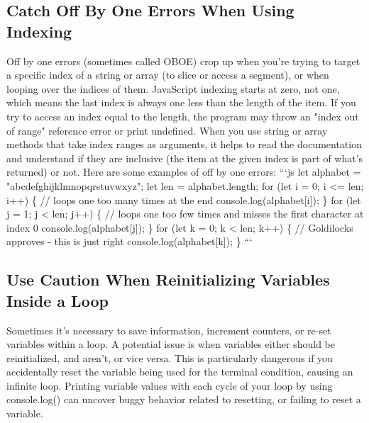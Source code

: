 \documentclass{article}%
\begin{document}
\subsection{Catch Off By One Errors When Using Indexing}%
\label{subsec:CatchOffByOneErrorsWhenUsingIndexing}%
Off by one errors (sometimes called OBOE) crop up when you're trying to target a specific index of a string or array (to slice or access a segment), or when looping over the indices of them. JavaScript indexing starts at zero, not one, which means the last index is always one less than the length of the item. If you try to access an index equal to the length, the program may throw an "index out of range" reference error or print undefined.\newline%
When you use string or array methods that take index ranges as arguments, it helps to read the documentation and understand if they are inclusive (the item at the given index is part of what's returned) or not. Here are some examples of off by one errors:\newline%
```js\newline%
let alphabet = "abcdefghijklmnopqrstuvwxyz";\newline%
let len = alphabet.length;\newline%
for (let i = 0; i <= len; i++) \{\newline%
  // loops one too many times at the end\newline%
  console.log(alphabet{[}i{]});\newline%
\}\newline%
for (let j = 1; j < len; j++) \{\newline%
  // loops one too few times and misses the first character at index 0\newline%
  console.log(alphabet{[}j{]});\newline%
\}\newline%
for (let k = 0; k < len; k++) \{\newline%
  // Goldilocks approves {-} this is just right\newline%
  console.log(alphabet{[}k{]});\newline%
\}\newline%
```\newline%

%
\subsection{Use Caution When Reinitializing Variables Inside a Loop}%
\label{subsec:UseCautionWhenReinitializingVariablesInsideaLoop}%
Sometimes it's necessary to save information, increment counters, or re{-}set variables within a loop. A potential issue is when variables either should be reinitialized, and aren't, or vice versa. This is particularly dangerous if you accidentally reset the variable being used for the terminal condition, causing an infinite loop.\newline%
Printing variable values with each cycle of your loop by using console.log() can uncover buggy behavior related to resetting, or failing to reset a variable.\newline%
\end{document}
